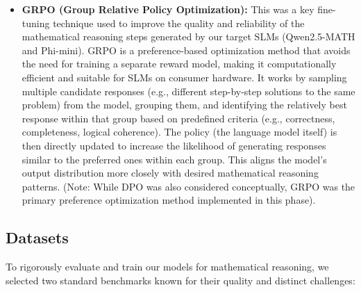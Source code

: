 \documentclass[11pt]{article}
\begin{document}
\begin{itemize}
    \item \textbf{GRPO (Group Relative Policy Optimization):}
    This was a key fine-tuning technique used to improve the quality and reliability of the mathematical reasoning steps generated by our target SLMs (Qwen2.5-MATH and Phi-mini). GRPO is a preference-based optimization method that avoids the need for training a separate reward model, making it computationally efficient and suitable for SLMs on consumer hardware. It works by sampling multiple candidate responses (e.g., different step-by-step solutions to the same problem) from the model, grouping them, and identifying the relatively best response within that group based on predefined criteria (e.g., correctness, completeness, logical coherence). The policy (the language model itself) is then directly updated to increase the likelihood of generating responses similar to the preferred ones within each group. This aligns the model's output distribution more closely with desired mathematical reasoning patterns. (Note: While DPO was also considered conceptually, GRPO was the primary preference optimization method implemented in this phase).

\end{itemize}

\subsection{Datasets}
To rigorously evaluate and train our models for mathematical reasoning, we selected two standard benchmarks known for their quality and distinct challenges:
\end{document}
